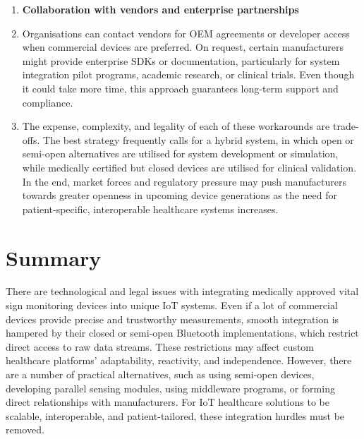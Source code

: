 \begin{enumerate}
	\item \textbf{Collaboration with vendors and enterprise partnerships}
	\item [] Organisations can contact vendors for OEM agreements or developer access when commercial devices are preferred.  On request, certain manufacturers might provide enterprise SDKs or documentation, particularly for system integration pilot programs, academic research, or clinical trials.  Even though it could take more time, this approach guarantees long-term support and compliance.
	\item[] The expense, complexity, and legality of each of these workarounds are trade-offs.  The best strategy frequently calls for a hybrid system, in which open or semi-open alternatives are utilised for system development or simulation, while medically certified but closed devices are utilised for clinical validation.  In the end, market forces and regulatory pressure may push manufacturers towards greater openness in upcoming device generations as the need for patient-specific, interoperable healthcare systems increases.
\end{enumerate}

\section{Summary} %
There are technological and legal issues with integrating medically approved vital sign monitoring devices into unique IoT systems.  Even if a lot of commercial devices provide precise and trustworthy measurements, smooth integration is hampered by their closed or semi-open Bluetooth implementations, which restrict direct access to raw data streams.  These restrictions may affect custom healthcare platforms' adaptability, reactivity, and independence.  However, there are a number of practical alternatives, such as using semi-open devices, developing parallel sensing modules, using middleware programs, or forming direct relationships with manufacturers.  For IoT healthcare solutions to be scalable, interoperable, and patient-tailored, these integration hurdles must be removed.
